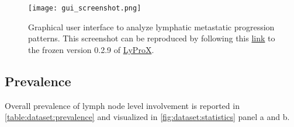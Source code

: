 \documentclass[\relativeRoot/main.tex]{subfiles}
\begin{document}
\begin{figure}
    \centering
    \texttt{[image: gui\_screenshot.png]}
    \caption{Graphical user interface to analyze lymphatic metastatic progression patterns. This screenshot can be reproduced by following this \href{https://2021-oropharynx.lyprox.org/dashboard/?nicotine_abuse=0&hpv_status=0&neck_dissection=-1&n_status=0&central=0&extension=1&subsite__in=base&subsite__in=tonsil&subsite__in=rest&t_stage__in=3&t_stage__in=4&institution__in=1&modalities=0&modalities=1&modalities=2&modalities=3&modality_combine=OR&contra_I=0&contra_Ia=0&contra_Ib=0&contra_II=0&contra_IIa=0&contra_IIb=0&contra_III=0&contra_IV=0&contra_V=0&contra_VII=0&ipsi_I=0&ipsi_Ia=0&ipsi_Ib=0&ipsi_II=1&ipsi_IIa=0&ipsi_IIb=0&ipsi_III=0&ipsi_IV=0&ipsi_V=0&ipsi_VII=0&show_percent=False&render=dashboard}{ link} to the frozen version 0.2.9 of \href{https://lyprox.org}{ LyProX}.}
    \label{fig:dataset:gui_screenshot}
\end{figure}

\subsection*{Prevalence}

Overall prevalence of lymph node level involvement is reported in \cref{table:dataset:prevalence} and visualized in \cref{fig:dataset:statistics} panel a and b.
\end{document}
